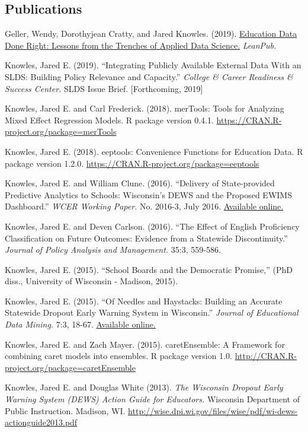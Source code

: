 \documentclass[margin,line]{res}
\begin{document}
\begin{resume}
\section{\sc Publications}

Geller, Wendy, Dorothyjean Cratty, and Jared Knowles. (2019). \uline{Education Data Done Right: Lessons from the Trenches of Applied Data Science.} \emph{LeanPub.}

Knowles, Jared E. (2019). ``Integrating Publicly Available External Data With an SLDS: Building 
Policy Relevance and Capacity.'' \emph{College & Career Readiness & Success Center.} 
SLDS Issue Brief. [Forthcoming, 2019]

Knowles, Jared E. and Carl Frederick. (2018). merTools: Tools for Analyzing Mixed 
Effect Regression Models. R package version 0.4.1. 
\url{https://CRAN.R-project.org/package=merTools}

Knowles, Jared E. (2018). eeptools: Convenience Functions for Education Data. 
R package version 1.2.0. \url{https://CRAN.R-project.org/package=eeptools}

Knowles, Jared E. and William Clune. (2016). ``Delivery of State-provided Predictive
Analytics to Schools: Wisconsin’s DEWS and the Proposed EWIMS Dashboard.'' 
\emph{WCER Working Paper.} No. 2016-3, July 2016. \href{http://wcer-web.ad.education.wisc.edu/docs/working-papers/Working_Paper_No_2016_03.pdf}{Available online.}

Knowles, Jared E. and Deven Carlson. (2016). ``The Effect of English Proficiency Classification on Future Outcomes: 
Evidence from a Statewide Discontinuity.'' \emph{Journal of Policy Analysis and Management.}
35:3, 559-586. 

Knowles, Jared E. (2015). ``School Boards and the Democratic Promise,'' (PhD diss., University of 
Wisconsin - Madison, 2015).

Knowles, Jared E. (2015). ``Of Needles and Haystacks: Building an Accurate Statewide 
Dropout Early Warning System in Wisconsin.'' \emph{Journal of Educational Data 
Mining.} 7:3, 18-67. 
\href{http://www.educationaldatamining.org/JEDM/index.php/JEDM/article/view/JEDM082}{Available online.}

Knowles, Jared E. and Zach Mayer. (2015). caretEnsemble: A Framework for combining 
caret models into ensembles. R package version 1.0. \url{http://CRAN.R-project.org/package=caretEnsemble}

Knowles, Jared E. and Douglas White (2013). \emph{The Wisconsin Dropout Early Warning System (DEWS) Action Guide for Educators.} Wisconsin Department of Public Instruction. Madison, WI. \url{http://wise.dpi.wi.gov/files/wise/pdf/wi-dews-actionguide2013.pdf}


\end{resume}
\end{document}
